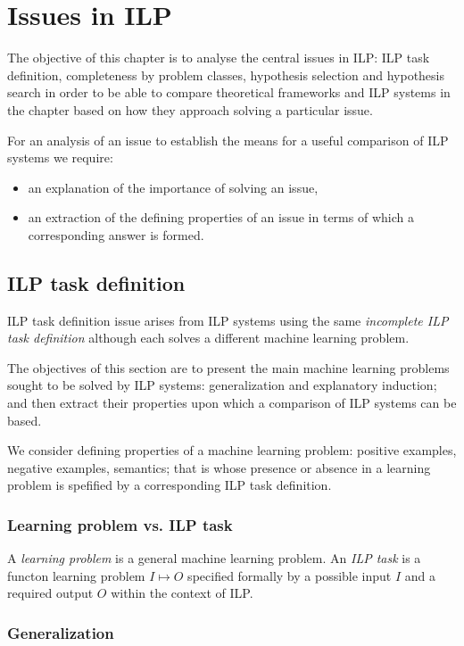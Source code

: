\chapter{Issues in ILP}\label{chap:issues_in_ilp}
The objective of this chapter is to analyse the central issues in ILP: ILP task definition, completeness by problem classes, hypothesis selection and hypothesis search in order to be able to compare theoretical frameworks and ILP systems in the chapter  based on how they approach solving a particular issue.

For an analysis of an issue to establish the means for a useful comparison of ILP systems we require:
\begin{itemize}
\item an explanation of the importance of solving an issue,
\item an extraction of the defining properties of an issue in terms of which a corresponding answer is formed.
\end{itemize}

\section{ILP task definition}\label{sec:ilp_task_definition}
ILP task definition issue arises from ILP systems using the same \emph{incomplete ILP task definition} although each solves a different machine learning problem.

The objectives of this section are to present the main machine learning problems sought to be solved by ILP systems: generalization and explanatory induction; and then extract their properties upon which a comparison of ILP systems can be based.

We consider defining properties of a machine learning problem: positive examples, negative examples, semantics; that is whose presence or absence in a learning problem is spefified by a corresponding ILP task definition.

\subsection{Learning problem vs. ILP task}
A \emph{learning problem} is a general machine learning problem. An \emph{ILP task} is a functon learning problem $I \mapsto O$ specified formally by a possible input $I$ and a required output $O$ within the context of ILP.

\subsection{Generalization}\label{generalization}

